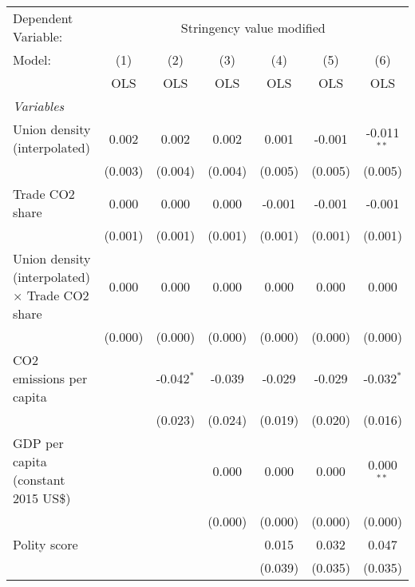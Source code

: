 
\begingroup
\centering
\begin{tabular}{lcccccc}
   \toprule
   Dependent Variable: & \multicolumn{6}{c}{Stringency value modified}\\
   Model:                                                 & (1)     & (2)          & (3)     & (4)     & (5)     & (6)\\  
                                                          &  OLS    & OLS          & OLS     & OLS     & OLS     & OLS\\  
   \midrule
   \emph{Variables}\\
   Union density (interpolated)                           & 0.002   & 0.002        & 0.002   & 0.001   & -0.001  & -0.011$^{**}$\\   
                                                          & (0.003) & (0.004)      & (0.004) & (0.005) & (0.005) & (0.005)\\   
   Trade CO2 share                                        & 0.000   & 0.000        & 0.000   & -0.001  & -0.001  & -0.001\\   
                                                          & (0.001) & (0.001)      & (0.001) & (0.001) & (0.001) & (0.001)\\   
   Union density (interpolated) $\times$ Trade CO2 share  & 0.000   & 0.000        & 0.000   & 0.000   & 0.000   & 0.000\\   
                                                          & (0.000) & (0.000)      & (0.000) & (0.000) & (0.000) & (0.000)\\   
   CO2 emissions per capita                               &         & -0.042$^{*}$ & -0.039  & -0.029  & -0.029  & -0.032$^{*}$\\   
                                                          &         & (0.023)      & (0.024) & (0.019) & (0.020) & (0.016)\\   
   GDP per capita (constant 2015 US\$)                    &         &              & 0.000   & 0.000   & 0.000   & 0.000$^{**}$\\   
                                                          &         &              & (0.000) & (0.000) & (0.000) & (0.000)\\   
   Polity score                                           &         &              &         & 0.015   & 0.032   & 0.047\\   
                                                          &         &              &         & (0.039) & (0.035) & (0.035)\\   

\end{tabular}
